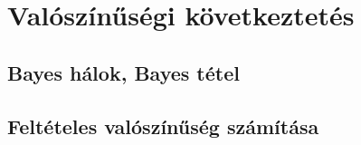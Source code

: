 \section{Valószínűségi következtetés}

\subsection{Bayes hálok, Bayes tétel}

\subsection{Feltételes valószínűség számítása}
